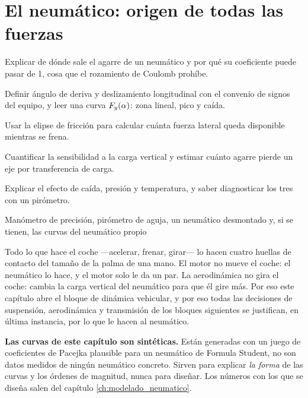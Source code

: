 \chapter{El neumático: origen de todas las fuerzas}
\label{ch:neumatico}


\begin{objetivos}
  \item Explicar de dónde sale el agarre de un neumático y por qué su
        coeficiente puede pasar de 1, cosa que el rozamiento de Coulomb prohíbe.
  \item Definir ángulo de deriva y deslizamiento longitudinal con el convenio de
        signos del equipo, y leer una curva $F_y(\alpha)$: zona lineal, pico y
        caída.
  \item Usar la elipse de fricción para calcular cuánta fuerza lateral queda
        disponible mientras se frena.
  \item Cuantificar la sensibilidad a la carga vertical y estimar cuánto agarre
        pierde un eje por transferencia de carga.
  \item Explicar el efecto de caída, presión y temperatura, y saber diagnosticar
        los tres con un pirómetro.
\end{objetivos}

%
{Manómetro de precisión, pirómetro de aguja, un neumático desmontado y, si se
tienen, las curvas del neumático propio}

Todo lo que hace el coche ---acelerar, frenar, girar--- lo hacen cuatro huellas
de contacto del tamaño de la palma de una mano. El motor no mueve el coche: el
neumático lo hace, y el motor solo le da un par. La aerodinámica no gira el
coche: cambia la carga vertical del neumático para que él gire más. Por eso
este capítulo abre el bloque de dinámica vehicular, y por eso todas las
decisiones de suspensión, aerodinámica y transmisión de los bloques siguientes
se justifican, en última instancia, por lo que le hacen al neumático.

\begin{clave}
\textbf{Las curvas de este capítulo son sintéticas.} Están generadas con un juego
de coeficientes de Pacejka plausible para un neumático de Formula Student, no son
datos medidos de ningún neumático concreto. Sirven para explicar \emph{la forma}
de las curvas y los órdenes de magnitud, nunca para diseñar. Los números con los
que se diseña salen del capítulo \ref{ch:modelado_neumatico}.
\end{clave}

